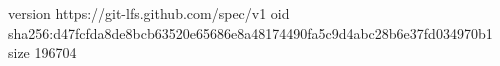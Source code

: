 version https://git-lfs.github.com/spec/v1
oid sha256:d47fcfda8de8bcb63520e65686e8a48174490fa5c9d4abc28b6e37fd034970b1
size 196704
